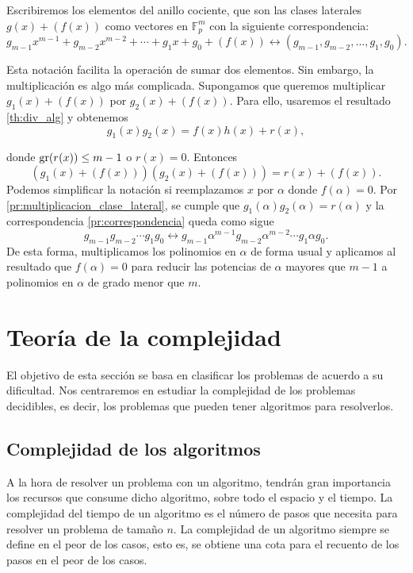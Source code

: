Escribiremos los elementos del anillo cociente, que son las clases laterales $g(x) + (f(x))$ como vectores en $\mathbb{F}_p^m$ con la siguiente correspondencia:
\begin{equation}
    \label{pr:correspondencia}
    g_{m-1} x^{m-1} + g_{m-2} x^{m-2} + \cdots + g_{1} x + g_0 + (f(x)) \leftrightarrow (g_{m-1}, g_{m-2}, ..., g_1, g_0).
\end{equation}

Esta notación facilita la operación de sumar dos elementos. Sin embargo, la multiplicación es algo más complicada. Supongamos que queremos multiplicar $g_1(x) + (f(x))$ por $g_2(x) + (f(x))$. Para ello, usaremos el resultado \ref{th:div_alg} y obtenemos
\begin{equation}
    \label{pr:multiplicacion_clase_lateral}
    g_1(x) g_2(x) = f(x) h(x) + r(x),
\end{equation}

donde $\operatorname{gr}(r(x)) \leq m - 1$ o $r(x) = 0$. Entonces 
\[
    (g_1(x) + (f(x))) (g_2(x) + (f(x))) = r(x) + (f(x)).
\]
Podemos simplificar la notación si reemplazamos $x$ por $\alpha$ donde $f(\alpha) = 0$. Por \eqref{pr:multiplicacion_clase_lateral}, se cumple que $g_1(\alpha) g_2(\alpha) = r(\alpha)$ y la correspondencia \eqref{pr:correspondencia} queda como sigue
\[
    g_{m-1} g_{m-2} \cdots g_1 g_0 \leftrightarrow  g_{m-1} \alpha^{m-1} g_{m-2} \alpha^{m-2}\cdots g_1 \alpha g_0.
\]
De esta forma, multiplicamos los polinomios en $\alpha$ de forma usual y aplicamos al resultado que $f(\alpha) = 0$ para reducir las potencias de $\alpha$ mayores que $m-1$ a polinomios en $\alpha$ de grado menor que $m$.

\section{Teoría de la complejidad}

El objetivo de esta sección se basa en clasificar los problemas de acuerdo a su dificultad. Nos centraremos en estudiar la complejidad de los problemas decidibles, es decir, los problemas que pueden tener algoritmos para resolverlos.

\subsection{Complejidad de los algoritmos}

A la hora de resolver un problema con un algoritmo, tendrán gran importancia los recursos que consume dicho algoritmo, sobre todo el espacio y el tiempo. La complejidad del tiempo de un algoritmo es el número de pasos que necesita para resolver un problema de tamaño $n$. La complejidad de un algoritmo siempre se define en el peor de los casos, esto es, se obtiene una cota para el recuento de los pasos en el peor de los casos. 


